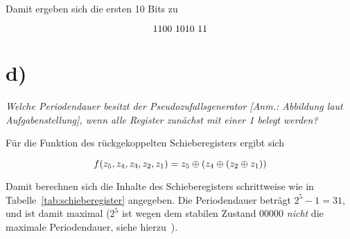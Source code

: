 \noindent
Damit ergeben sich die ersten 10 Bits zu

\begin{equation}\notag
    1100\ 1010\  11
\end{equation}


\section{d)}

\textit{Welche Periodendauer besitzt der Pseudozufallsgenerator [Anm.: Abbildung laut Aufgabenstellung], wenn alle
Register zunächst mit einer 1 belegt werden?}

\noindent
Für die Funktion des  rückgekoppelten Schieberegisters ergibt sich

\begin{equation}\notag
    f(z_5, z_4, z_3, z_2, z_1) = z_5 \oplus (z_4 \oplus (z_2 \oplus z_1))
\end{equation}


\noindent
Damit berechnen sich die Inhalte des Schieberegisters schrittweise wie in Tabelle~\ref{tab:schieberegister} angegeben.
Die Periodendauer beträgt $2^5 - 1 = 31$, und ist damit maximal ($2^5$ ist wegen dem stabilen Zustand $00000$ \textit{nicht} die maximale Periodendauer, siehe hierzu~\cite[\textbf{Lösung zu Aufgabe 6.2}, 111]{ITS3}).

